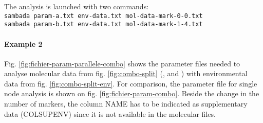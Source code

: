 \documentclass[a4paper,11pt]{article}
\begin{document}
The analysis is launched with two commands:\\
\verb+sambada param-a.txt env-data.txt mol-data-mark-0-0.txt+\\
\verb+sambada param-b.txt env-data.txt mol-data-mark-1-4.txt+\\


\paragraph{Example 2}

Fig. \ref{fig:fichier-param-parallele-combo} shows the parameter files needed to analyse molecular data from fig. \ref{fig:combo-split} (,  and ) with environmental data from fig. \ref{fig:combo-split-env}.
For comparison, the parameter file for single node analysis is shown on fig. \ref{fig:fichier-param-combo}.
Beside the change in the number of markers, the column NAME has to be indicated as supplementary data (COLSUPENV) since it is not available in the molecular files.
\end{document}
